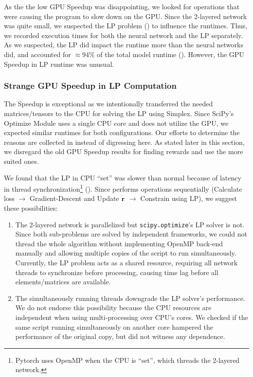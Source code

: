 As the the low GPU Speedup was disappointing, we looked for operations that were causing the program to slow down on the GPU. Since the 2-layered network was quite small, we suspected the LP problem () to influence the runtimes. Thus, we recorded execution times for both the neural network and the LP separately. As we suspected, the LP did impact the runtime more than the neural networks did, and accounted for $\approx 94\%$ of the total model runtime (). However, the GPU Speedup in LP runtime was unusual.

\subsubsection{Strange GPU Speedup in LP Computation}
The Speedup is exceptional as we intentionally transferred the needed matrices/tensors to the CPU for solving the LP using Simplex. Since SciPy's Optimize Module uses a single CPU core and does not utilize the GPU, we expected similar runtimes for both configurations. Our efforts to determine the reasons are collected in  instead of digressing here. As stated later in this section, we disregard the old GPU Speedup results for finding rewards and use the more suited ones.

We found that the LP in CPU ``set'' was slower than normal because of latency in thread synchronization\footnote{Pytorch uses OpenMP \cite{PTDocs,OpenMP} when the CPU is ``set'', which threads the 2-layered network.} (). Since  performs operations sequentially (Calculate loss $\rightarrow$ Gradient-Descent and Update $\mathbf{r}$ $\rightarrow$ Constrain using LP), we suggest these possibilities:
\begin{enumerate}
    \item The 2-layered network is parallelized but \texttt{scipy.optimize}'s LP solver is not. Since both sub-problems are solved by independent frameworks, we could not thread the whole algorithm without implementing OpenMP \cite{OpenMP} back-end manually and allowing multiple copies of the script to run simultaneously. Currently, the LP problem acts as a shared resource, requiring all network threads to synchronize before processing, causing time lag before all elements/matrices are available.
    \item The simultaneously running threads downgrade the LP solver's performance. We do not endorse this possibility because the CPU resources are independent when using multi-processing over CPU's cores. We checked if the same script running simultaneously on another core hampered the performance of the original copy, but did not witness any dependence.
\end{enumerate}

